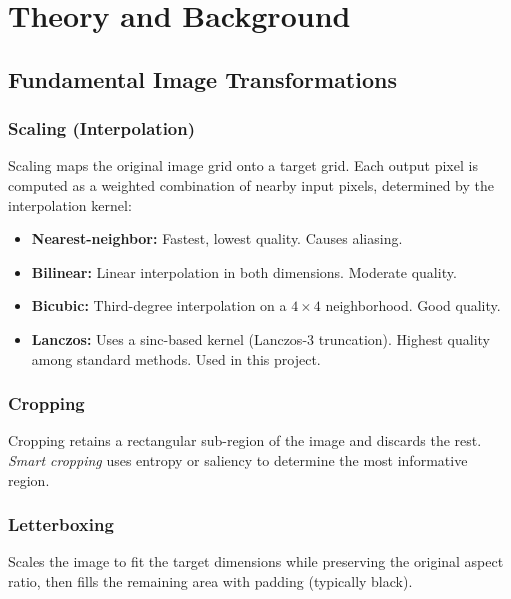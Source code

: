 \documentclass[12pt,a4paper]{article}
\begin{document}
\newpage
\section{Theory and Background}

\subsection{Fundamental Image Transformations}

\subsubsection{Scaling (Interpolation)}

Scaling maps the original image grid onto a target grid. Each output pixel is computed as a weighted combination of nearby input pixels, determined by the interpolation kernel:

\begin{itemize}
    \item \textbf{Nearest-neighbor:} Fastest, lowest quality. Causes aliasing.
    \item \textbf{Bilinear:} Linear interpolation in both dimensions. Moderate quality.
    \item \textbf{Bicubic:} Third-degree interpolation on a $4\times 4$ neighborhood. Good quality.
    \item \textbf{Lanczos:} Uses a sinc-based kernel (Lanczos-3 truncation). Highest quality among standard methods. Used in this project.
\end{itemize}

\subsubsection{Cropping}

Cropping retains a rectangular sub-region of the image and discards the rest. \emph{Smart cropping} uses entropy or saliency to determine the most informative region.

\subsubsection{Letterboxing}

Scales the image to fit the target dimensions while preserving the original aspect ratio, then fills the remaining area with padding (typically black).
\end{document}
